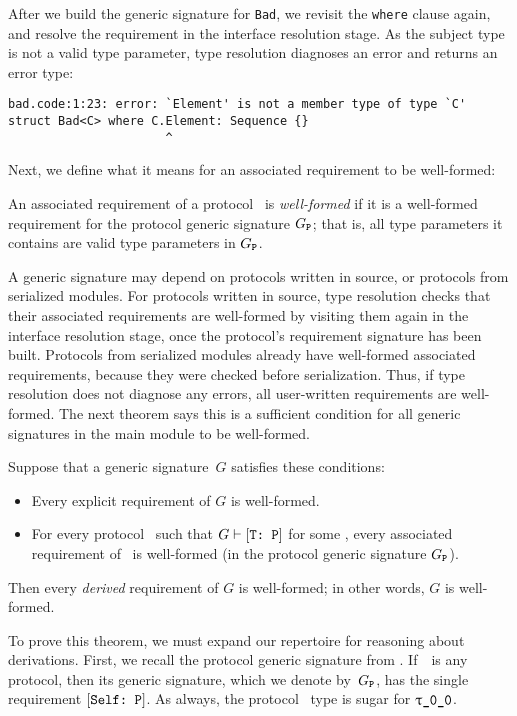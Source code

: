 \documentclass[../generics]{subfiles}
\begin{document}
After we build the generic signature for \texttt{Bad}, we revisit the \texttt{where} clause again, and resolve the requirement in the interface resolution stage. As the subject type is not a valid type parameter, type resolution diagnoses an error and returns an error type:
\begin{Verbatim}
bad.code:1:23: error: `Element' is not a member type of type `C'
struct Bad<C> where C.Element: Sequence {}
                      ^
\end{Verbatim}

Next, we define what it means for an associated requirement to be well-formed:
\begin{definition}
An associated requirement of a protocol \tP\ is \emph{well-formed} if it is a well-formed requirement for the protocol generic signature $G_{\texttt{P}}$; that is, all type parameters it contains are valid type parameters in $G_{\texttt{P}}$.
\end{definition}

A generic signature may depend on protocols written in source, or protocols from serialized modules. For protocols written in source, type resolution checks that their associated requirements are well-formed by visiting them again in the interface resolution stage, once the protocol's requirement signature has been built. Protocols from serialized modules already have well-formed associated requirements, because they were checked before serialization. Thus, if type resolution does not diagnose any errors, all user-written requirements are well-formed. The next theorem says this is a sufficient condition for all generic signatures in the main module to be well-formed.

\begin{theorem}\label{valid theorem}
Suppose that a generic signature~$G$ satisfies these conditions:
\begin{itemize}
\item Every explicit requirement of $G$ is well-formed.
\item For every protocol \tP\ such that $G\vdash[\texttt{T:~P}]$ for some \tT, every associated requirement of \tP\ is well-formed (in the protocol generic signature $G_{\texttt{P}}$).
\end{itemize}
Then every \emph{derived} requirement of $G$ is well-formed; in other words, $G$ is well-formed.
\end{theorem}
To prove this theorem, we must expand our repertoire for reasoning about derivations. First, we recall the protocol generic signature from . If~\tP\ is any protocol, then its generic signature, which we denote by~$G_{\texttt{P}}$, has the single requirement $[\texttt{Self:~P}]$. As always, the protocol \tSelf\ type is sugar for $\rT$.
\end{document}

